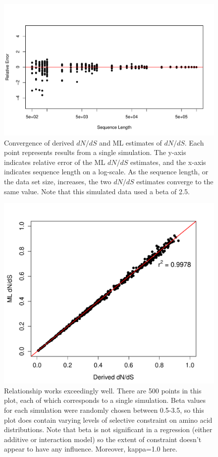 \documentclass[11pt]{article}
\begin{document}
\begin{figure}[H]
\centerline{\includegraphics[width=6in]{figures/convergence.pdf}}
\caption{\label{conv} Convergence of derived $dN/dS$ and ML estimates of $dN/dS$. Each point represents results from a single simulation. The y-axis indicates relative error of the ML $dN/dS$ estimates, and the x-axis indicates sequence length on a log-scale. As the sequence length, or the data set size, increases, the two $dN/dS$ estimates converge to the same value. Note that this simulated data used a beta of 2.5.}
\end{figure}

\begin{figure}[H]
\centerline{\includegraphics[width=6in]{figures/simpleregression.pdf}}
\caption{\label{simple} Relationship works exceedingly well. There are 500 points in this plot, each of which corresponds to a single simulation. Beta values for each simulation were randomly chosen between 0.5-3.5, so this plot does contain varying levels of selective constraint on amino acid distributions. Note that beta is not significant in a regression (either additive or interaction model) so the extent of constraint doesn't appear to have any influence. Moreover, kappa=1.0 here.}
\end{figure}

	
	
	
\end{document}

